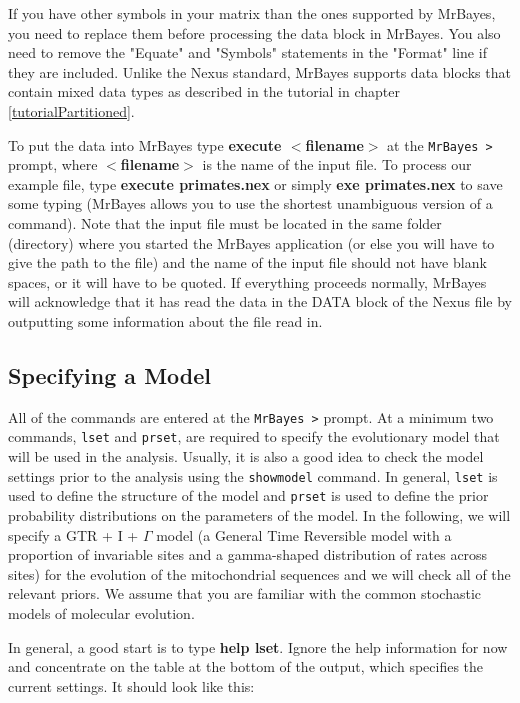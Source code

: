 \documentclass[12pt]{book}
\begin{document}
 If you have other symbols in your matrix than the ones supported by MrBayes, you need to replace them
 before processing the data block in MrBayes. You also need to remove the "Equate" and "Symbols" statements
 in the "Format" line if they are included. Unlike the Nexus standard, MrBayes supports data blocks that 
 contain mixed data types as described in the tutorial in chapter \ref{tutorialPartitioned}.

To put the data into MrBayes type \textbf{execute $<$filename$>$} at the \texttt{MrBayes >} prompt, 
where \textbf{$<$filename$>$} is the name of the input file. To process our example file, type 
\textbf{execute primates.nex} or simply \textbf{exe primates.nex} to save some typing (MrBayes allows
 you to use the shortest unambiguous version of a command). Note that the input file must be located in
 the same folder (directory) where you started the MrBayes application (or else you will have to give the
 path to the file) and the name of the input file should not have blank spaces, or it will have to be 
quoted. If everything proceeds normally, MrBayes will acknowledge that it has read the data in the DATA 
block of the Nexus file by outputting some information about the file read in.

\subsection{Specifying a Model}
All of the commands are entered at the \texttt{MrBayes >} prompt. At a minimum two commands, \texttt{lset}
 and \texttt{prset}, are required to specify the evolutionary model that will be used in the analysis.
 Usually, it is also a good idea to check the model settings prior to the analysis using the 
 \texttt{showmodel} command. In general, \texttt{lset} is used to define the structure of the model and
 \texttt{prset} is used to define the prior probability distributions on the parameters of the model. In
 the following, we will specify a GTR + I + $\Gamma$ model (a General Time Reversible model with a proportion
 of invariable sites and a gamma-shaped distribution of rates across sites) for the evolution of the
 mitochondrial sequences and we will check all of the relevant priors. We assume that you are familiar with
 the common stochastic models of molecular evolution.

In general, a good start is to type \textbf{help lset}. Ignore the help information for now and concentrate
 on the table at the bottom of the output, which specifies the current settings. It should look like this:
\end{document}
